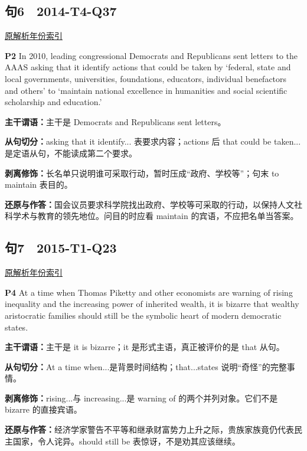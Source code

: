\documentclass[11pt,a4paper]{article}
\begin{document}
\subsection{句6　2014-T4-Q37}
\noindent \href{https://zj139.github.io/math-notes/english/d0543caa2ebd73b99c00cc00/\#q37}{原解析}\quad \hyperref[idx-2014-T4-Q37]{年份索引}
\begin{evidence}\textbf{P2} In 2010, leading congressional Democrats and Republicans sent letters to the AAAS asking that it identify actions that could be taken by ‘federal, state and local governments, universities, foundations, educators, individual benefactors and others’ to ‘maintain national excellence in humanities and social scientific scholarship and education.’\end{evidence}
\noindent\textbf{主干谓语：}主干是 Democrats and Republicans sent letters。\par
\noindent\textbf{从句切分：}asking that it identify... 表要求内容；actions 后 that could be taken...是定语从句，不能读成第二个要求。\par
\noindent\textbf{剥离修饰：}长名单只说明谁可采取行动，暂时压成“政府、学校等”；句末 to maintain 表目的。\par
\noindent\textbf{还原与作答：}国会议员要求科学院找出政府、学校等可采取的行动，以保持人文社科学术与教育的领先地位。问目的时应看 maintain 的宾语，不应把名单当答案。\par
{}
\subsection{句7　2015-T1-Q23}
\noindent \href{https://zj139.github.io/math-notes/english/bd84b09056a8e650262124b0/\#q23}{原解析}\quad \hyperref[idx-2015-T1-Q23]{年份索引}
\begin{evidence}\textbf{P4} At a time when Thomas Piketty and other economists are warning of rising inequality and the increasing power of inherited wealth, it is bizarre that wealthy aristocratic families should still be the symbolic heart of modern democratic states.\end{evidence}
\noindent\textbf{主干谓语：}主干是 it is bizarre；it 是形式主语，真正被评价的是 that 从句。\par
\noindent\textbf{从句切分：}At a time when...是背景时间结构；that...states 说明“奇怪”的完整事情。\par
\noindent\textbf{剥离修饰：}rising...与 increasing...是 warning of 的两个并列对象。它们不是 bizarre 的直接宾语。\par
\noindent\textbf{还原与作答：}经济学家警告不平等和继承财富势力上升之际，贵族家族竟仍代表民主国家，令人诧异。should still be 表惊讶，不是劝其应该继续。\par
{}
\end{document}
